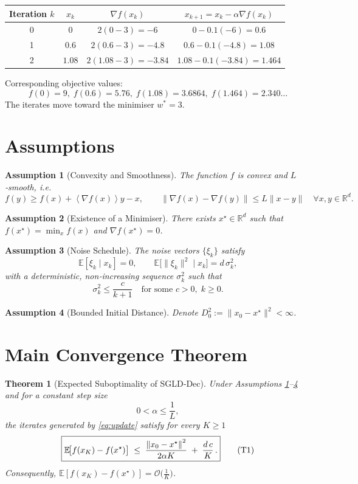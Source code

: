 \documentclass[11pt]{article}
\newtheorem{theorem}{Theorem}
\newtheorem{assumption}{Assumption}
\newcommand{\EE}{\mathbb{E}}
\newcommand{\RR}{\mathbb{R}}
\newcommand{\norm}[1]{\left\lVert #1\right\rVert}
\newcommand{\inner}[1]{\left\langle #1\right\rangle}
\begin{document}
\begin{center}
\begin{tabular}{c|c|c|c}
Iteration $k$ & $x_{k}$ & $\nabla f(x_{k})$ & $x_{k+1}=x_{k}-\alpha\nabla f(x_{k})$ \\ \hline
0 & $0$ & $2(0-3)=-6$ & $0-0.1(-6)=0.6$ \\
1 & $0.6$ & $2(0.6-3)=-4.8$ & $0.6-0.1(-4.8)=1.08$ \\
2 & $1.08$ & $2(1.08-3)=-3.84$ & $1.08-0.1(-3.84)=1.464$ \\
\end{tabular}
\end{center}
Corresponding objective values:
\[
f(0)=9,\; f(0.6)=5.76,\; f(1.08)=3.6864,\; f(1.464)=2.340\ldots
\]
The iterates move toward the minimiser $w^{*}=3$.

\newpage
\section*{Assumptions}
\begin{assumption}[Convexity and Smoothness]\label{ass:convex-smooth}
The function $f$ is convex and $L$‑smooth, i.e.
\[
f(y)\ge f(x)+\inner{\nabla f(x)}{y-x},\qquad 
\|\nabla f(x)-\nabla f(y)\|\le L\|x-y\|\quad\forall x,y\in\RR^{d}.
\]
\end{assumption}
\begin{assumption}[Existence of a Minimiser]\label{ass:opt}
There exists $x^{\star}\in\RR^{d}$ such that $f(x^{\star})=\min_{x}f(x)$ and $\nabla f(x^{\star})=0$.
\end{assumption}
\begin{assumption}[Noise Schedule]\label{ass:noise}
The noise vectors $\{\xi_{k}\}$ satisfy  
\[
\EE[\xi_{k}\mid x_{k}]=0,\qquad
\EE\big[\|\xi_{k}\|^{2}\mid x_{k}\big]=d\,\sigma_{k}^{2},
\]
with a deterministic, non‑increasing sequence $\sigma_{k}^{2}$ such that
\[
\sigma_{k}^{2}\le \frac{c}{k+1}\quad\text{for some }c>0,\;k\ge0.
\tag{A3}
\]
\end{assumption}
\begin{assumption}[Bounded Initial Distance]\label{ass:init}
Denote $D_{0}^{2}:=\|x_{0}-x^{\star}\|^{2}<\infty$.
\end{assumption}

\section*{Main Convergence Theorem}
\begin{theorem}[Expected Suboptimality of SGLD‑Dec]\label{thm:main}
Under Assumptions \ref{ass:convex-smooth}–\ref{ass:init} and for a constant step size 
\[
0<\alpha\le\frac{1}{L},
\]
the iterates generated by \eqref{eq:update} satisfy for every $K\ge1$
\[
\boxed{%
\EE\!\big[f(x_{K})-f(x^{\star})\big]\;\le\;
\frac{\norm{x_{0}-x^{\star}}^{2}}{2\alpha K}
\;+\;
\frac{d\,c}{K}\,.
}
\tag{T1}
\]
Consequently, $\EE[f(x_{K})-f(x^{\star})]=\mathcal O\!\big(\tfrac{1}{K}\big)$.
\end{theorem}
\end{document}
